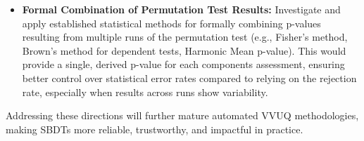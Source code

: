 \begin{itemize}
  \item \textbf{Formal Combination of Permutation Test Results:} Investigate and apply established statistical methods for formally combining p-values resulting from multiple runs of the permutation test (e.g., Fisher's method, Brown's method for dependent tests, Harmonic Mean p-value). This would provide a single, derived p-value for each components assessment, ensuring better control over statistical error rates compared to relying on the rejection rate, especially when results across runs show variability.
\end{itemize}

Addressing these directions will further mature automated VVUQ methodologies, making SBDTs more reliable, trustworthy, and impactful in practice. \blacksquare